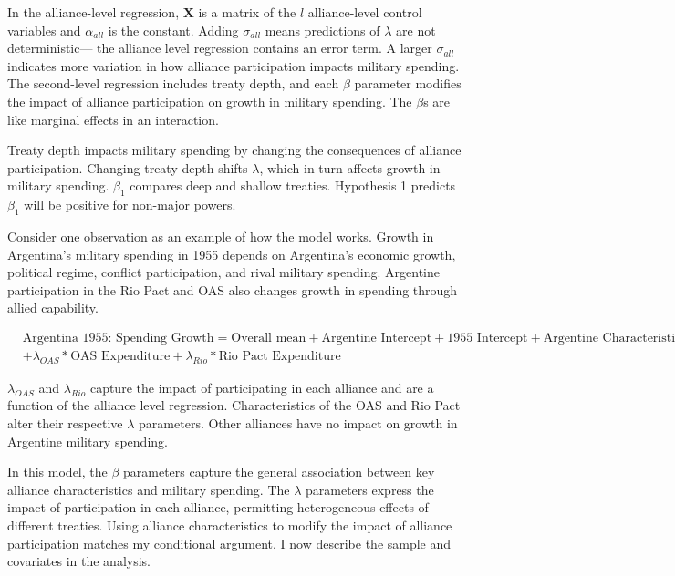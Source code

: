 \documentclass[12pt]{article}
\begin{document}
In the alliance-level regression, $\textbf{X}$ is a matrix of the $l$ alliance-level control variables and $\alpha_{all}$ is the constant.
Adding $\sigma_{all}$ means predictions of $\lambda$ are not deterministic--- the alliance level regression contains an error term. 
A larger $\sigma_{all}$ indicates more variation in how alliance participation impacts military spending. 
The second-level regression includes treaty depth, and each $\beta$ parameter modifies the impact of alliance participation on growth in military spending. 
The $\beta$s are like marginal effects in an interaction. 


Treaty depth impacts military spending by changing the consequences of alliance participation. 
Changing treaty depth shifts $\lambda$, which in turn affects growth in military spending.
$\beta_1$ compares deep and shallow treaties. 
Hypothesis 1 predicts $\beta_1$ will be positive for non-major powers.


Consider one observation as an example of how the model works. 
Growth in Argentina's military spending in 1955 depends on Argentina's economic growth, political regime, conflict participation, and rival military spending. 
Argentine participation in the Rio Pact and OAS also changes growth in spending through allied capability. 


\begin{equation}
\begin{split}
& \mbox{Argentina 1955: Spending Growth} = \mbox{Overall mean}
+ \mbox{Argentine Intercept} + \mbox{1955 Intercept} 
+ \mbox{Argentine Characteristics} \\
& + \lambda_{OAS} * \mbox{OAS Expenditure} + \lambda_{Rio} * \mbox{Rio Pact Expenditure}
\end{split} 
\end{equation}


$\lambda_{OAS}$ and $\lambda_{Rio}$ capture the impact of participating in each alliance and are a function of the alliance level regression. 
Characteristics of the OAS and Rio Pact alter their respective $\lambda$ parameters.
Other alliances have no impact on growth in Argentine military spending. 


In this model, the $\beta$ parameters capture the general association between key alliance characteristics and military spending. 
The $\lambda$ parameters express the impact of participation in each alliance, permitting heterogeneous effects of different treaties. 
Using alliance characteristics to modify the impact of alliance participation matches my conditional argument. 
I now describe the sample and covariates in the analysis.  
\end{document}
